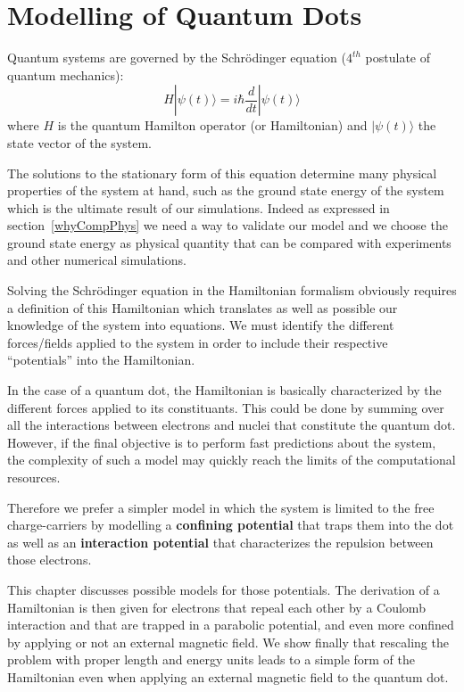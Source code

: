 \chapter{Modelling of Quantum Dots} %
\label{model}

Quantum systems are governed by the Schr\"odinger equation ($4^{th}$ postulate of quantum mechanics):
\begin{equation}
H |\psi(t) \rangle = i \hbar \frac{d}{dt} |\psi(t) \rangle
\end{equation}
where $H$ is the quantum Hamilton operator (or Hamiltonian) and $|\psi(t) \rangle$ the state vector of the system.

The solutions to the stationary form of this equation determine many physical properties of the system at hand, such as the ground state energy of the system which is the ultimate result of our simulations. Indeed as expressed in section~\ref{whyCompPhys} we need a way to validate our model and we choose the ground state energy as physical quantity that can be compared with experiments and other numerical simulations.

Solving the Schr\"odinger equation in the Hamiltonian formalism obviously requires a definition of this Hamiltonian which translates as well as possible our knowledge of the system into equations. We must identify the different forces/fields applied to the system in order to include their respective ``potentials'' into the Hamiltonian.

In the case of a quantum dot, the Hamiltonian is basically characterized by the different forces applied to its constituants. This could be done by summing over all the interactions between electrons and nuclei that constitute the quantum dot. However, if the final objective is to perform fast predictions about the system, the complexity of such a model may quickly reach the limits of the computational resources.

Therefore we prefer a simpler model in which the system is limited to the free charge-carriers by modelling a \textbf{confining potential} that traps them into the dot as well as an \textbf{interaction potential} that characterizes the repulsion between those electrons.

This chapter discusses possible models for those potentials. The derivation of a Hamiltonian is then given for electrons that repeal each other by a Coulomb interaction and that are trapped in a parabolic potential, and even more confined by applying or not an external magnetic field.
We show finally that rescaling the problem with proper length and energy units leads to a simple form of the Hamiltonian even when applying an external magnetic field to the quantum dot.


